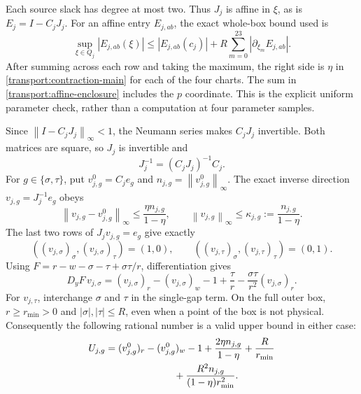 \documentclass[11pt,reqno]{amsart}
\theoremstyle{definition}
\theoremstyle{remark}
\newcommand{\iin}[1]{\left\|#1\right\|_\infty}
\begin{document}
Each source slack has degree at most two.  Thus \(J_j\) is affine
in \(\xi\), as is \(E_j=I-C_jJ_j\).  For an affine entry
\(E_{j,ab}\), the exact whole-box bound used is
\begin{equation}\label{transport:affine-enclosure}
\sup_{\xi\in Q_j}|E_{j,ab}(\xi)|\le
|E_{j,ab}(c_j)|+
R\sum_{m=0}^{23}\left|\partial_{\xi_m}E_{j,ab}\right|.
\end{equation}
After summing across each row and taking the maximum, the right side
is \(\eta\) in \eqref{transport:contraction-main} for each of the
four charts.  The sum in \eqref{transport:affine-enclosure} includes
the \(p\) coordinate.  This is the explicit uniform parameter check,
rather than a computation at four parameter samples.

Since \(\iin{I-C_jJ_j}<1\), the Neumann series makes \(C_jJ_j\)
invertible.  Both matrices are square, so \(J_j\) is invertible and
\[
J_j^{-1}=(C_jJ_j)^{-1}C_j.
\]
For \(g\in\{\sigma,\tau\}\), put
\(v^0_{j,g}=C_je_g\) and \(n_{j,g}=\iin{v^0_{j,g}}\).
The exact inverse direction \(v_{j,g}=J_j^{-1}e_g\) obeys
\begin{equation}\label{transport:neumann-direction}
\iin{v_{j,g}-v^0_{j,g}}\le
\frac{\eta n_{j,g}}{1-\eta},\qquad
\iin{v_{j,g}}\le\kappa_{j,g}:=
\frac{n_{j,g}}{1-\eta}.
\end{equation}
The last two rows of \(J_jv_{j,g}=e_g\) give exactly
\[
((v_{j,\sigma})_\sigma,(v_{j,\sigma})_\tau)=(1,0),
\qquad
((v_{j,\tau})_\sigma,(v_{j,\tau})_\tau)=(0,1).
\]
Using \(F=r-w-\sigma-\tau+\sigma\tau/r\), differentiation gives
\begin{equation}\label{transport:height-derivative-exact}
D_yF\,v_{j,\sigma}
=(v_{j,\sigma})_r-(v_{j,\sigma})_w-1
 +\frac\tau r-\frac{\sigma\tau}{r^2}(v_{j,\sigma})_r.
\end{equation}
For \(v_{j,\tau}\), interchange \(\sigma\) and \(\tau\) in the
single-gap term.  On the full outer box,
\(r\ge r_{\min}>0\) and \(|\sigma|,|\tau|\le R\), even when a
point of the box is not physical.  Consequently the following rational
number is a valid upper bound in either case:
\begin{equation}\label{transport:height-upper-formula}
\begin{split}
U_{j,g}={}&(v^0_{j,g})_r-(v^0_{j,g})_w-1
 +\frac{2\eta n_{j,g}}{1-\eta}+\frac R{r_{\min}}\\
&\hspace{20mm}+\frac{R^2n_{j,g}}{(1-\eta)r_{\min}^2}.
\end{split}
\end{equation}
\end{document}
